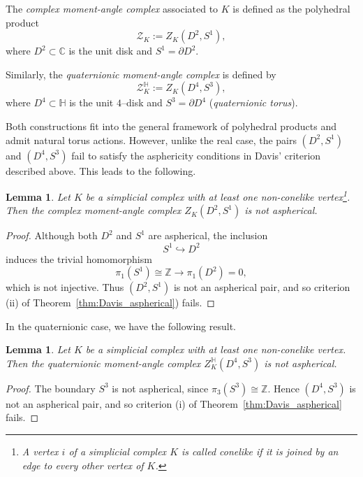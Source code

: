 \documentclass[11pt,a4paper]{article}
\numberwithin{equation}{section}
\newtheorem{lemma}[definition]{Lemma}
\theoremstyle{named}
\begin{document}
The \emph{complex moment-angle complex} associated to $K$ is defined as the polyhedral product
\[
\mathcal{Z}_K := Z_K(D^2,S^1),
\]
where $D^2 \subset \mathbb{C}$ is the unit disk and $S^1=\partial D^2$.

Similarly, the \emph{quaternionic moment-angle complex} is defined by
\[
\mathcal{Z}_K^{\mathbb{H}} := Z_K(D^4,S^3),
\]
where $D^4 \subset \mathbb{H}$ is the unit $4$--disk and $S^3=\partial D^4$ (\emph{quaternionic torus}).

Both constructions fit into the general framework of polyhedral products \cite{bbhg} and admit natural torus actions. However, unlike the real case, the pairs $(D^2,S^1)$ and $(D^4,S^3)$ fail to satisfy the asphericity conditions in Davis' criterion described above. This leads to the following.

\begin{lemma}
\label{lem:complex-not-aspherical}
Let $K$ be a simplicial complex with at least one non-conelike vertex\footnote{A vertex $i$ of a simplicial complex $K$ is called conelike if it is joined by an edge to every other vertex of $K$.}. Then the complex moment-angle complex \(Z_K(D^2,S^1)\) is not aspherical.
\end{lemma}

\begin{proof}
Although both $D^2$ and $S^1$ are aspherical, the inclusion
\[
S^1 \hookrightarrow D^2
\]
induces the trivial homomorphism
\[
\pi_1(S^1)\cong \mathbb{Z} \longrightarrow \pi_1(D^2)=0,
\]
which is not injective. Thus $(D^2,S^1)$ is not an aspherical pair,
and so criterion (ii) of Theorem~\ref{thm:Davis_aspherical}) fails.
\end{proof}

In the quaternionic case, we have the following result. 

\begin{lemma}
\label{lem:quaternionic-not-aspherical}
Let $K$ be a simplicial complex with at least one non-conelike vertex. Then the quaternionic moment-angle complex \(Z_K^{\mathbb{H}}(D^4,S^3)\) is not aspherical.
\end{lemma}

\begin{proof}
The boundary $S^3$ is not aspherical, since $\pi_3(S^3)\cong \mathbb{Z}$. Hence $(D^4,S^3)$ is not an aspherical pair, and so criterion (i) of Theorem~\ref{thm:Davis_aspherical} fails.
\end{proof}

\medskip
\end{document}
